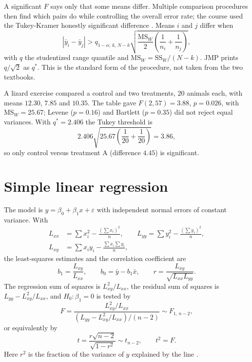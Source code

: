 A significant $F$ says only that some
means differ. Multiple comparison
procedures then find which pairs do while
controlling the overall error rate; the
course used the Tukey-Kramer honestly
significant difference
\cite[Section 12-2]{triola2012elementary}.
Means $i$ and $j$ differ when
$$
|\bar{y}_i - \bar{y}_j| >
q_{1-\alpha;\,k,\,N-k}
\sqrt{\frac{\mathrm{MS}_W}{2}
\left(\frac{1}{n_i}+\frac{1}{n_j}\right)},
$$
with $q$ the studentized range quantile
and $\mathrm{MS}_W = \mathrm{SS}_W/(N-k)$.
JMP prints $q/\sqrt{2}$ as $q^*$. This is
the standard form of the procedure, not
taken from the two textbooks.

\begin{example}
\label{example-anova-lizards}
A lizard exercise compared a control and
two treatments, $20$ animals each, with
means $12.30$, $7.85$ and $10.35$. The
table gave $F(2,57) = 3.88$,
$p = 0.026$, with
$\mathrm{MS}_W = 25.67$; Levene
($p = 0.16$) and Bartlett ($p = 0.35$)
did not reject equal variances. With
$q^* = 2.406$ the Tukey threshold is
$$
2.406\sqrt{25.67\left(\frac{1}{20}
+ \frac{1}{20}\right)} = 3.86,
$$
so only control versus treatment A
(difference $4.45$) is significant.
\end{example}

\section{Simple linear regression}
\label{section-regression}

The model is $y = \beta_0 + \beta_1 x +
\varepsilon$ with independent normal
errors of constant variance. With
$$
\begin{aligned}
L_{xx} &= \sum x_i^2
- \frac{(\sum x_i)^2}{n}, \qquad
L_{yy} = \sum y_i^2
- \frac{(\sum y_i)^2}{n}, \\
L_{xy} &= \sum x_i y_i
- \frac{\sum x_i \sum y_i}{n},
\end{aligned}
$$
the least-squares estimates and the
correlation coefficient are
$$
b_1 = \frac{L_{xy}}{L_{xx}},
\qquad
b_0 = \bar{y} - b_1\bar{x},
\qquad
r = \frac{L_{xy}}{\sqrt{L_{xx}L_{yy}}}.
$$
The regression sum of squares is
$L_{xy}^2/L_{xx}$, the residual sum of
squares is $L_{yy} - L_{xy}^2/L_{xx}$,
and $H_0\colon \beta_1 = 0$ is tested by
$$
F = \frac{L_{xy}^2/L_{xx}}
{(L_{yy} - L_{xy}^2/L_{xx})/(n-2)}
\sim F_{1,\,n-2},
$$
or equivalently by
$$
t = \frac{r\sqrt{n-2}}{\sqrt{1-r^2}}
\sim t_{n-2},
\qquad t^2 = F.
$$
Here $r^2$ is the fraction of the
variance of $y$ explained by the line
\cite[Sections
11.3, 11.4,
11.7, 11.8]{rosner2011biostatistics}.

